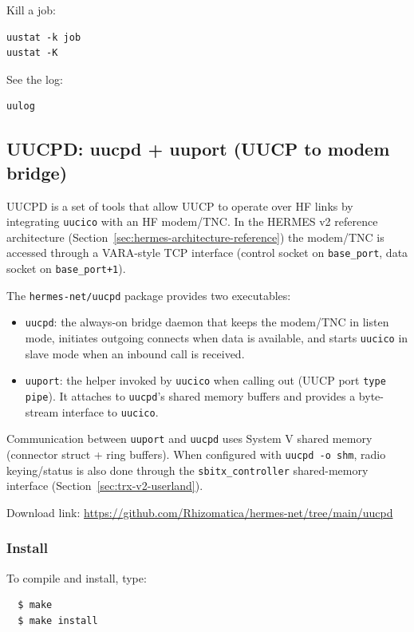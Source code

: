 Kill a job:
\begin{verbatim}
uustat -k job
uustat -K
\end{verbatim}

See the log:
\begin{verbatim}
uulog
\end{verbatim}


\subsection{UUCPD: uucpd + uuport (UUCP to modem bridge)}
\label{sec:uucpd}

UUCPD is a set of tools that allow UUCP to operate over HF links by integrating \verb|uucico| with an HF modem/TNC. In the HERMES v2
reference architecture (Section~\ref{sec:hermes-architecture-reference}) the modem/TNC is accessed through a VARA-style TCP interface
(control socket on \verb|base_port|, data socket on \verb|base_port+1|).

The \verb|hermes-net/uucpd| package provides two executables:
\begin{itemize}
\item \verb|uucpd|: the always-on bridge daemon that keeps the modem/TNC in listen mode, initiates outgoing connects when data is available,
  and starts \verb|uucico| in slave mode when an inbound call is received.
\item \verb|uuport|: the helper invoked by \verb|uucico| when calling out (UUCP port \verb|type pipe|). It attaches to \verb|uucpd|'s shared
  memory buffers and provides a byte-stream interface to \verb|uucico|.
\end{itemize}

Communication between \verb|uuport| and \verb|uucpd| uses System V shared memory (connector struct + ring buffers). When configured with
\verb|uucpd -o shm|, radio keying/status is also done through the \verb|sbitx_controller| shared-memory interface (Section~\ref{sec:trx-v2-userland}).

Download link: \url{https://github.com/Rhizomatica/hermes-net/tree/main/uucpd} \\

\subsubsection{Install}
To compile and install, type:
\begin{verbatim}
  $ make
  $ make install    
\end{verbatim}

